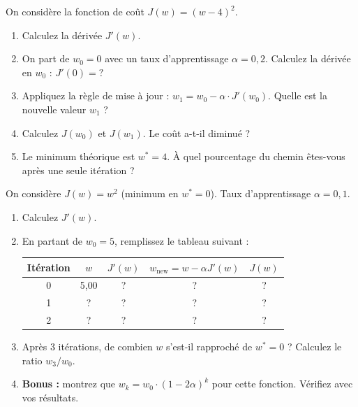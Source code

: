 On consid\`{e}re la fonction de co\^{u}t $J(w) = (w - 4)^2$.

\begin{enumerate}[label=\alph*)]
    \item Calculez la d\'{e}riv\'{e}e $J'(w)$.

    \item On part de $w_0 = 0$ avec un taux d'apprentissage $\alpha = 0{,}2$.
        Calculez la d\'{e}riv\'{e}e en $w_0$ : $J'(0) = ?$

    \item Appliquez la r\`{e}gle de mise \`{a} jour :
        $w_1 = w_0 - \alpha \cdot J'(w_0)$.
        Quelle est la nouvelle valeur $w_1$ ?

    \item Calculez $J(w_0)$ et $J(w_1)$. Le co\^{u}t a-t-il diminu\'{e} ?

    \item Le minimum th\'{e}orique est $w^* = 4$. \`{A} quel pourcentage du chemin
        \^{e}tes-vous apr\`{e}s une seule it\'{e}ration ?
\end{enumerate}


On consid\`{e}re $J(w) = w^2$ (minimum en $w^* = 0$). Taux d'apprentissage $\alpha = 0{,}1$.

\begin{enumerate}[label=\alph*)]
    \item Calculez $J'(w)$.

    \item En partant de $w_0 = 5$, remplissez le tableau suivant :

    \begin{center}
    \renewcommand{\arraystretch}{1.3}
    \begin{tabular}{c|c|c|c|c}
        \toprule
        It\'{e}ration & $w$ & $J'(w)$ & $w_{\text{new}} = w - \alpha J'(w)$ & $J(w)$ \\
        \midrule
        0 & 5{,}00 & \phantom{00}?\phantom{00} & \phantom{00}?\phantom{00} & \phantom{00}?\phantom{00} \\
        1 & ?      & ?  & ?  & ?  \\
        2 & ?      & ?  & ?  & ?  \\
        \bottomrule
    \end{tabular}
    \end{center}

    \item Apr\`{e}s 3 it\'{e}rations, de combien $w$ s'est-il rapproch\'{e} de $w^* = 0$ ?
        Calculez le ratio $w_3 / w_0$.

    \item \textbf{Bonus :} montrez que $w_k = w_0 \cdot (1 - 2\alpha)^k$ pour cette fonction.
        V\'{e}rifiez avec vos r\'{e}sultats.
\end{enumerate}

